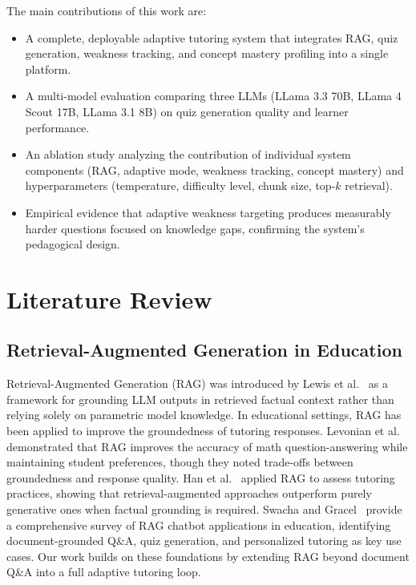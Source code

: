 \documentclass[runningheads]{llncs}
\begin{document}
The main contributions of this work are:
\begin{itemize}
    \item A complete, deployable adaptive tutoring system that integrates RAG, quiz generation, weakness tracking, and concept mastery profiling into a single platform.
    \item A multi-model evaluation comparing three LLMs (LLama 3.3 70B, LLama 4 Scout 17B, LLama 3.1 8B) on quiz generation quality and learner performance.
    \item An ablation study analyzing the contribution of individual system components (RAG, adaptive mode, weakness tracking, concept mastery) and hyperparameters (temperature, difficulty level, chunk size, top-$k$ retrieval).
    \item Empirical evidence that adaptive weakness targeting produces measurably harder questions focused on knowledge gaps, confirming the system's pedagogical design.
\end{itemize}

\section{Literature Review}

\subsection{Retrieval-Augmented Generation in Education}

Retrieval-Augmented Generation (RAG) was introduced by Lewis et al.~\cite{lewis2020rag} as a framework for grounding LLM outputs in retrieved factual context rather than relying solely on parametric model knowledge. In educational settings, RAG has been applied to improve the groundedness of tutoring responses. Levonian et al.~\cite{levonian2023ragmath} demonstrated that RAG improves the accuracy of math question-answering while maintaining student preferences, though they noted trade-offs between groundedness and response quality. Han et al.~\cite{han2024tutoringrag} applied RAG to assess tutoring practices, showing that retrieval-augmented approaches outperform purely generative ones when factual grounding is required. Swacha and Gracel~\cite{swacha2025survey} provide a comprehensive survey of RAG chatbot applications in education, identifying document-grounded Q\&A, quiz generation, and personalized tutoring as key use cases. Our work builds on these foundations by extending RAG beyond document Q\&A into a full adaptive tutoring loop.
\end{document}

